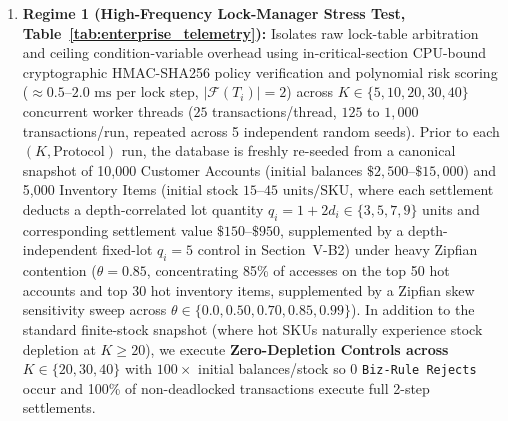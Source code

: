 \documentclass[conference,10pt]{IEEEtran}
\begin{document}
\begin{enumerate}
    \item \textbf{Regime 1 (High-Frequency Lock-Manager Stress Test, Table~\ref{tab:enterprise_telemetry}):} Isolates raw lock-table arbitration and ceiling condition-variable overhead using in-critical-section CPU-bound cryptographic HMAC-SHA256 policy verification and polynomial risk scoring ($\approx 0.5\text{--}2.0\text{ ms}$ per lock step, $|\mathcal{F}(T_i)| = 2$) across $K \in \{5, 10, 20, 30, 40\}$ concurrent worker threads ($25$ transactions/thread, $125$ to $1{,}000$ transactions/run, repeated across 5 independent random seeds). Prior to each $(K, \text{Protocol})$ run, the database is freshly re-seeded from a canonical snapshot of 10,000 Customer Accounts (initial balances $\$2{,}500\text{--}\$15{,}000$) and 5,000 Inventory Items (initial stock $15\text{--}45\text{ units/SKU}$, where each settlement deducts a depth-correlated lot quantity $q_i = 1 + 2d_i \in \{3, 5, 7, 9\}$ units and corresponding settlement value $\$150\text{--}\$950$, supplemented by a depth-independent fixed-lot $q_i = 5$ control in Section~V-B2) under heavy Zipfian contention ($\theta = 0.85$, concentrating 85\% of accesses on the top 50 hot accounts and top 30 hot inventory items, supplemented by a Zipfian skew sensitivity sweep across $\theta \in \{0.0, 0.50, 0.70, 0.85, 0.99\}$). In addition to the standard finite-stock snapshot (where hot SKUs naturally experience stock depletion at $K \ge 20$), we execute \textbf{Zero-Depletion Controls across $K \in \{20, 30, 40\}$} with $100\times$ initial balances/stock so $0$ \texttt{Biz-Rule Rejects} occur and 100\% of non-deadlocked transactions execute full 2-step settlements.

\end{enumerate}
\end{document}
